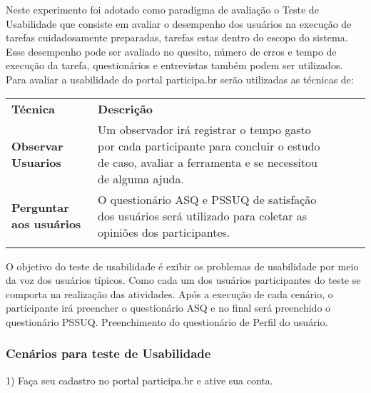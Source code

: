 Neste experimento foi adotado como paradigma de avaliação o Teste de Usabilidade que consiste em avaliar o desempenho dos usuários na execução de tarefas cuidadosamente preparadas, tarefas estas dentro do escopo do sistema. Esse desempenho pode ser avaliado no quesito, número de erros e tempo de execução da tarefa, questionários e entrevistas também podem ser utilizados.
Para avaliar a usabilidade do portal participa.br serão utilizadas as técnicas de:


\begin{table}[h]
\begin{tabular}{lllll}
\cline{1-2}
\multicolumn{1}{|l|}{\textbf{Técnica}}                & \multicolumn{1}{l|}{\textbf{Descrição}}                                                                                                                                    &  &  &  \\ \cline{1-2}
\multicolumn{1}{|l|}{\textbf{Observar Usuarios}}      & \multicolumn{1}{l|}{Um observador irá registrar o tempo gasto por cada participante para concluir o estudo de caso, avaliar a ferramenta e se necessitou de alguma ajuda.} &  &  &  \\ \cline{1-2}
\multicolumn{1}{|l|}{\textbf{Perguntar aos usuários}} & \multicolumn{1}{l|}{O questionário ASQ e PSSUQ de satisfação dos usuários será utilizado para coletar as opiniões dos participantes.}                                      &  &  &  \\ \cline{1-2}
                                                      &                                                                                                                                                                            &  &  & 
\end{tabular}
\end{table}

O objetivo do teste de usabilidade é exibir os problemas de usabilidade por meio da voz dos usuários típicos. Como cada um dos usuários participantes do teste se comporta na realização das atividades.
	Após a execução de cada cenário, o participante irá preencher o questionário ASQ e no final será preenchido o questionário PSSUQ.
	Preenchimento do questionário de Perfil do usuário.

\subsubsection{Cenários para teste de Usabilidade}

1) Faça seu cadastro no portal participa.br e ative sua conta.

